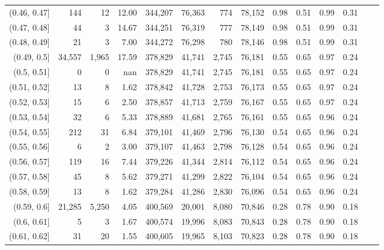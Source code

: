 \begin{tabular}{rrrrrrrrrrrrrr}
(0.46, 0.47]   &     144 &      12 &     12.00 &  344,207 &   76,363 &     774 &  78,152 &  0.98 &  0.51 &  0.99 &      0.31 \\
(0.47, 0.48]   &      44 &       3 &     14.67 &  344,251 &   76,319 &     777 &  78,149 &  0.98 &  0.51 &  0.99 &      0.31 \\
(0.48, 0.49]   &      21 &       3 &      7.00 &  344,272 &   76,298 &     780 &  78,146 &  0.98 &  0.51 &  0.99 &      0.31 \\
(0.49, 0.5]    &  34,557 &   1,965 &     17.59 &  378,829 &   41,741 &   2,745 &  76,181 &  0.55 &  0.65 &  0.97 &      0.24 \\
(0.5, 0.51]    &       0 &       0 &       nan &  378,829 &   41,741 &   2,745 &  76,181 &  0.55 &  0.65 &  0.97 &      0.24 \\
(0.51, 0.52]   &      13 &       8 &      1.62 &  378,842 &   41,728 &   2,753 &  76,173 &  0.55 &  0.65 &  0.97 &      0.24 \\
(0.52, 0.53]   &      15 &       6 &      2.50 &  378,857 &   41,713 &   2,759 &  76,167 &  0.55 &  0.65 &  0.97 &      0.24 \\
(0.53, 0.54]   &      32 &       6 &      5.33 &  378,889 &   41,681 &   2,765 &  76,161 &  0.55 &  0.65 &  0.96 &      0.24 \\
(0.54, 0.55]   &     212 &      31 &      6.84 &  379,101 &   41,469 &   2,796 &  76,130 &  0.54 &  0.65 &  0.96 &      0.24 \\
(0.55, 0.56]   &       6 &       2 &      3.00 &  379,107 &   41,463 &   2,798 &  76,128 &  0.54 &  0.65 &  0.96 &      0.24 \\
(0.56, 0.57]   &     119 &      16 &      7.44 &  379,226 &   41,344 &   2,814 &  76,112 &  0.54 &  0.65 &  0.96 &      0.24 \\
(0.57, 0.58]   &      45 &       8 &      5.62 &  379,271 &   41,299 &   2,822 &  76,104 &  0.54 &  0.65 &  0.96 &      0.24 \\
(0.58, 0.59]   &      13 &       8 &      1.62 &  379,284 &   41,286 &   2,830 &  76,096 &  0.54 &  0.65 &  0.96 &      0.24 \\
(0.59, 0.6]    &  21,285 &   5,250 &      4.05 &  400,569 &   20,001 &   8,080 &  70,846 &  0.28 &  0.78 &  0.90 &      0.18 \\
(0.6, 0.61]    &       5 &       3 &      1.67 &  400,574 &   19,996 &   8,083 &  70,843 &  0.28 &  0.78 &  0.90 &      0.18 \\
(0.61, 0.62]   &      31 &      20 &      1.55 &  400,605 &   19,965 &   8,103 &  70,823 &  0.28 &  0.78 &  0.90 &      0.18 \\

\end{tabular}
